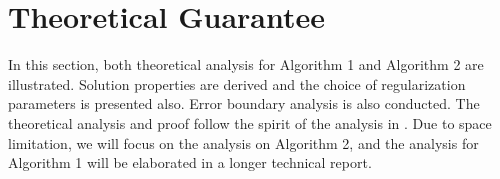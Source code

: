\documentclass{article}
\newcounter{thm_counter}
\newcounter{pro_counter}
\begin{document}
%


\section{Theoretical Guarantee}

In this section, both theoretical analysis for Algorithm 1 and Algorithm 2 are illustrated. Solution properties are derived and the choice of regularization parameters is presented also.
 Error boundary analysis is also conducted. The theoretical analysis and proof follow the spirit of the analysis in \cite{mtl:kdd2011:ChenZY11}.
Due to space limitation, we will focus on the analysis on Algorithm 2, and the analysis for Algorithm 1 will be elaborated in a longer technical report.
\end{document}
